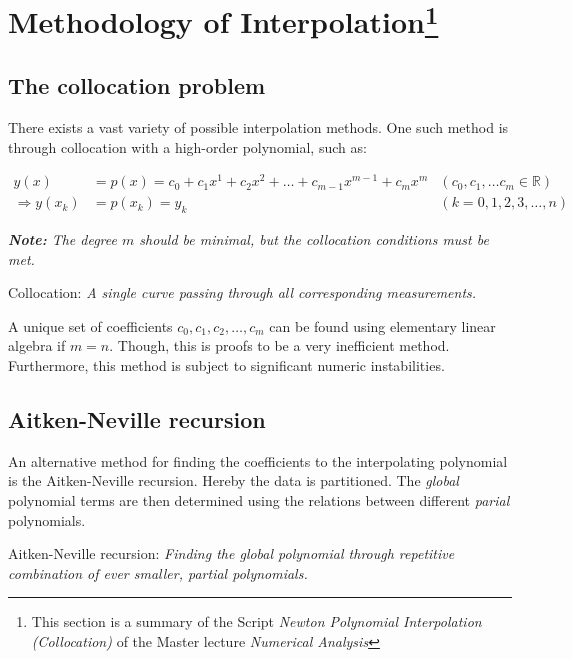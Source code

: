 \section{Methodology of Interpolation\footnote{This section is a summary of the
	Script \textit{Newton Polynomial Interpolation (Collocation)} of the
	Master lecture \textit{Numerical Analysis}}}

\subsection{The collocation problem}
There exists a vast variety of possible interpolation methods. One such method
is through collocation with a high-order polynomial, such as:

\begin{align}
	y(x) &= p(x) = c_0 + c_1 x^1 + c_2 x^2 + \dots
		+ c_{m-1} x^{m-1} + c_m x^m
			&(c_0, c_1, \dots c_m \in \mathbb{R}) \\
	\Rightarrow y(x_k) &= p(x_k) = y_k &(k = 0,1,2,3,\dots,n)
\end{align}

\textit{\textbf{Note:} The degree $m$ should be minimal, but the collocation
	conditions must be met.}

\begin{defn}
	Collocation: \textit{A single curve passing through all corresponding
		measurements.}
\end{defn}

A unique set of coefficients $c_0, c_1, c_2, \dots, c_m$ can be found using
elementary linear algebra if $m=n$. Though, this is proofs to be a very
inefficient method. Furthermore, this method is subject to significant numeric
instabilities.


\subsection{Aitken-Neville recursion}
An alternative method for finding the coefficients to the interpolating
polynomial is the Aitken-Neville recursion. Hereby the data is partitioned.
The \textit{global} polynomial terms are then determined using the relations
between different \textit{parial} polynomials.

\begin{defn}
	Aitken-Neville recursion: \textit{Finding the global polynomial through
		repetitive combination of ever smaller, partial polynomials.}
\end{defn}


